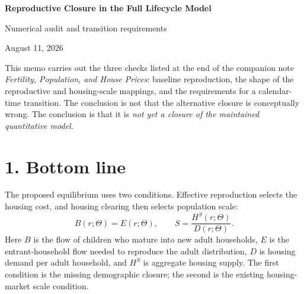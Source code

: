 \documentclass[11pt]{article}
\begin{document}
\begin{center}
{\LARGE\bfseries Reproductive Closure in the Full Lifecycle Model}\par
\vspace{3pt}
{\large Numerical audit and transition requirements}\par
\vspace{3pt}
{\small August 11, 2026}
\end{center}

\vspace{-2pt}
This memo carries out the three checks listed at the end of the companion note
\emph{Fertility, Population, and House Prices}: baseline reproduction, the
shape of the reproductive and housing-scale mappings, and the requirements for
a calendar-time transition.  The conclusion is not that the alternative
closure is conceptually wrong.  The conclusion is that it is \emph{not yet a
closure of the maintained quantitative model}.

\section*{1. Bottom line}

The proposed equilibrium uses two conditions.  Effective reproduction selects
the housing cost, and housing clearing then selects population scale:
\begin{equation}
 B(r;\Theta)=E(r;\Theta),
 \qquad
 S=\frac{H^S(r;\Theta)}{D(r;\Theta)}.
 \label{eq:closure}
\end{equation}
Here $B$ is the flow of children who mature into new adult households, $E$ is
the entrant-household flow needed to reproduce the adult distribution, $D$ is
housing demand per adult household, and $H^S$ is aggregate housing supply.  The
first condition is the missing demographic closure; the second is the existing
housing-market scale condition.
\end{document}
